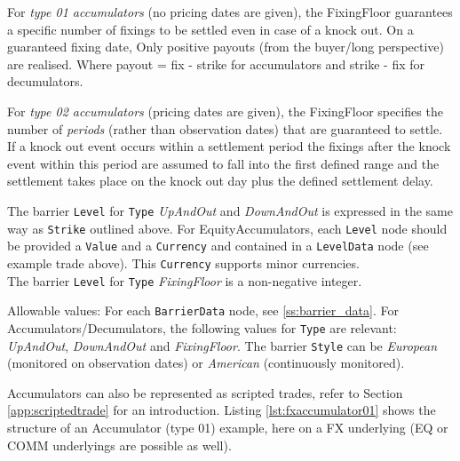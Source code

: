\begin{itemize}
    For \emph{type 01 accumulators} (no pricing dates are given), the FixingFloor guarantees a specific number of
    fixings to be settled even in case of a knock out. On a guaranteed fixing date, Only positive payouts (from the
    buyer/long perspective) are realised. Where payout = fix - strike for accumulators and strike - fix for decumulators.

    For \emph{type 02 accumulators} (pricing dates are given), the FixingFloor specifies the number of {\em periods}
    (rather than observation dates) that are guaranteed to settle. If a knock out event occurs within a settlement
    period the fixings after the knock event within this period are assumed to fall into the first defined range and the
    settlement takes place on the knock out day plus the defined settlement delay.

    The barrier \lstinline!Level! for \lstinline!Type! \emph{UpAndOut} and \emph{DownAndOut} is expressed in the same way as \lstinline!Strike! outlined above. For EquityAccumulators, each \lstinline!Level! node should be provided a \lstinline!Value! and a \lstinline!Currency! and contained in a \lstinline!LevelData! node (see example trade above). This \lstinline!Currency! supports minor currencies. \\
    The barrier \lstinline!Level! for \lstinline!Type!  \emph{FixingFloor}  is a non-negative integer.

    Allowable values: For each \lstinline!BarrierData! node, see \ref{ss:barrier_data}. For Accumulators/Decumulators, the following values for \lstinline!Type! are relevant: \emph{UpAndOut}, \emph{DownAndOut} and \emph{FixingFloor}. The barrier \lstinline!Style! can be \emph{European} (monitored on observation dates) or \emph{American} (continuously monitored).
\end{itemize}


Accumulators can also be represented as scripted trades, refer to Section \ref{app:scriptedtrade} for an
introduction. Listing \ref{lst:fxaccumulator01} shows the structure of an Accumulator (type 01) example, here on a FX
underlying (EQ or COMM underlyings are possible as well).

